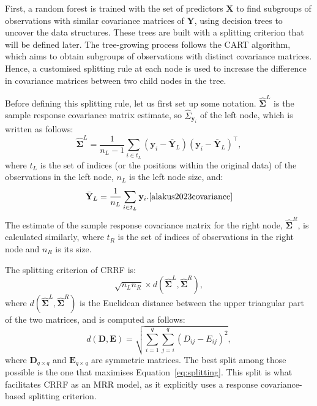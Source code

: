 \documentclass[11pt]{report} %
\begin{document}
First, a random forest is trained with the set of predictors \( \mathbf{X} \) to find subgroups of observations with similar covariance matrices of \( \mathbf{Y} \), using decision trees to uncover the data structures. These trees are built with a splitting criterion that will be defined later.\cite{alakus2023covariance} The tree-growing process follows the CART algorithm, which aims to obtain subgroups of observations with distinct covariance matrices.\cite{breiman1984classification} Hence, a customised splitting rule at each node is used to increase the difference in covariance matrices between two child nodes in the tree.\cite{moradian2017l_1, tabib2020non, alakucs2021conditional, athey2019generalized}

Before defining this splitting rule, let us first set up some notation. \( \boldsymbol{\hat{\Sigma}}^{L} \) is the sample response covariance matrix estimate,  so $\hat{\Sigma}_{\mathbf{y}_i}$ of the left node, which is written as follows:
\[
\boldsymbol{\hat{\Sigma}}^{L} = \frac{1}{n_L - 1} \sum_{i \in t_L} (\mathbf{y}_i - \bar{\mathbf{Y}}_L)(\mathbf{y}_i - \bar{\mathbf{Y}}_L)^\top,
\]
where \( t_L \) is the set of indices (or the positions within the original data) of the observations in the left node, \( n_L \) is the left node size, and: 
\[
\bar{\mathbf{Y}}_L = \frac{1}{n_L} \sum_{i \in t_L} \mathbf{y}_i.\cite{alakus2023covariance}
\]
The estimate of the sample response covariance matrix for the right node, \( \boldsymbol{\hat{\Sigma}}^{R} \), is calculated similarly, where $t_R$ is the set of indices of observations in the right node and \( n_R \) is its size. 

\noindent The splitting criterion of CRRF is:
\begin{equation}
\sqrt{n_L n_R} \times d(\boldsymbol{\hat{\Sigma}}^{L}, \boldsymbol{\hat{\Sigma}}^{R}),
\label{eq:splitting}
\end{equation}
\noindent where \( d(\boldsymbol{\hat{\Sigma}}^{L}, \boldsymbol{\hat{\Sigma}}^{R}) \) is the Euclidean distance between the upper triangular part of the two matrices, and is computed as follows:
\[
d(\mathbf{D}, \mathbf{E}) = \sqrt{\sum_{i=1}^{q} \sum_{j=i}^{q} (D_{ij} - E_{ij})^2},
\]
where \( \mathbf{D}_{q \times q} \) and \( \mathbf{E}_{q \times q} \) are symmetric matrices. \cite{alakus2023covariance}
The best split among those possible is the one that maximises Equation~\ref{eq:splitting}. This split is what facilitates CRRF as an MRR model, as it explicitly uses a response covariance-based splitting criterion. 
\end{document}
